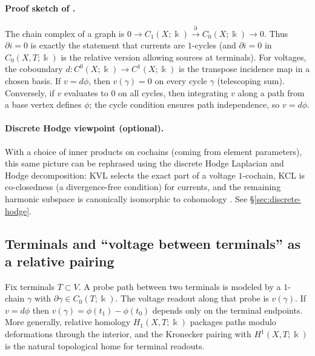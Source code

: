 \documentclass[11pt]{article}
\begin{document}
\paragraph{Proof sketch of .}
The chain complex of a graph is $0\to C_1(X;\Bbbk)\xrightarrow{\partial} C_0(X;\Bbbk)\to 0$.
Thus $\partial i=0$ is exactly the statement that currents are $1$-cycles (and $\partial i=0$ in $C_0(X,T;\Bbbk)$ is the relative version allowing sources at terminals).
For voltages, the coboundary $d\colon C^0(X;\Bbbk)\to C^1(X;\Bbbk)$ is the transpose incidence map in a chosen basis.
If $v=d\phi$, then $v(\gamma)=0$ on every cycle $\gamma$ (telescoping sum).
Conversely, if $v$ evaluates to $0$ on all cycles, then integrating $v$ along a path from a base vertex defines $\phi$; the cycle condition ensures path independence, so $v=d\phi$.

\paragraph{Discrete Hodge viewpoint (optional).}
With a choice of inner products on cochains (coming from element parameters), this same picture can be rephrased using the discrete Hodge Laplacian and Hodge decomposition: KVL selects the exact part of a voltage $1$-cochain, KCL is co-closedness (a divergence-free condition) for currents, and the remaining harmonic subspace is canonically isomorphic to cohomology \cite{arnold_falk_winther_2010_feec}.
See \S\ref{sec:discrete-hodge}.

\subsection{Terminals and ``voltage between terminals'' as a relative pairing}
Fix terminals $T\subset V$.
A probe path between two terminals is modeled by a $1$-chain $\gamma$ with $\partial\gamma\in C_0(T;\Bbbk)$.
The voltage readout along that probe is $v(\gamma)$.
If $v=d\phi$ then $v(\gamma)=\phi(t_1)-\phi(t_0)$ depends only on the terminal endpoints.
More generally, relative homology $H_1(X,T;\Bbbk)$ packages paths modulo deformations through the interior, and the Kronecker pairing with $H^1(X,T;\Bbbk)$ is the natural topological home for terminal readouts.
\end{document}
